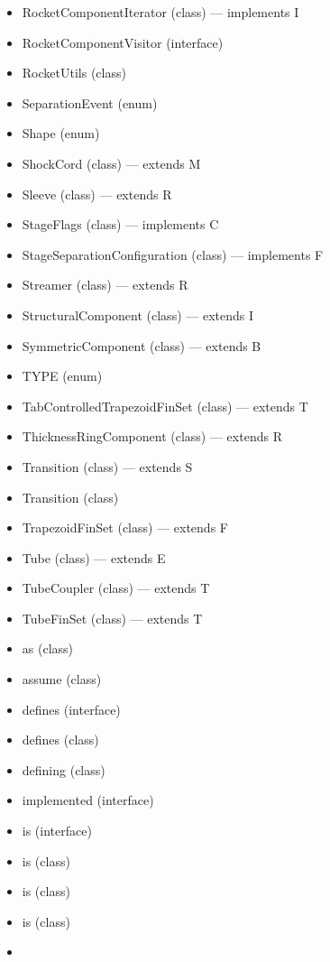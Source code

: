 \documentclass{amsdtx}
\begin{document}
\begin{itemize}
\begin{itemize}
\begin{itemize}
    \item
      RocketComponentIterator (class) --- implements I
    \item
      RocketComponentVisitor (interface)
    \item
      RocketUtils (class)
    \item
      SeparationEvent (enum)
    \item
      Shape (enum)
    \item
      ShockCord (class) --- extends M
    \item
      Sleeve (class) --- extends R
    \item
      StageFlags (class) --- implements C
    \item
      StageSeparationConfiguration (class) --- implements F
    \item
      Streamer (class) --- extends R
    \item
      StructuralComponent (class) --- extends I
    \item
      SymmetricComponent (class) --- extends B
    \item
      TYPE (enum)
    \item
      TabControlledTrapezoidFinSet (class) --- extends T
    \item
      ThicknessRingComponent (class) --- extends R
    \item
      Transition (class) --- extends S
    \item
      Transition (class)
    \item
      TrapezoidFinSet (class) --- extends F
    \item
      Tube (class) --- extends E
    \item
      TubeCoupler (class) --- extends T
    \item
      TubeFinSet (class) --- extends T
    \item
      as (class)
    \item
      assume (class)
    \item
      defines (interface)
    \item
      defines (class)
    \item
      defining (class)
    \item
      implemented (interface)
    \item
      is (interface)
    \item
      is (class)
    \item
      is (class)
    \item
      is (class)
    \item

\end{itemize}
\end{itemize}
\end{itemize}
\end{document}
